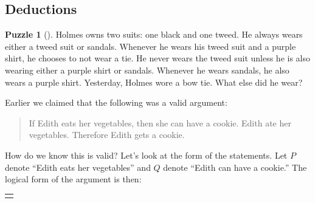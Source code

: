 \documentclass[10pt,]{book}
\theoremstyle{plain}
\theoremstyle{definition}
\theoremstyle{definition}
\theoremstyle{definition}
\newtheorem{investigation}[project]{Puzzle}
\numberwithin{equation}{chapter}
\newcommand{\hrulethin}  {\noalign{\hrule height 0.04em}}
\newlength{\panelmax}
\def\imp{\rightarrow}
\begin{document}
\subsection[{Deductions}]{Deductions}\label{subsection-56}
\begin{investigation}[]\label{investigation-12}
\hypertarget{p-2319}{}%
Holmes owns two suits: one black and one tweed. He always wears either a tweed suit or sandals. Whenever he wears his tweed suit and a purple shirt, he chooses to not wear a tie. He never wears the tweed suit unless he is also wearing either a purple shirt or sandals. Whenever he wears sandals, he also wears a purple shirt. Yesterday, Holmes wore a bow tie. What else did he wear?%
\end{investigation}
\hypertarget{p-2320}{}%
Earlier we claimed that the following was a valid argument:%
\begin{quote}\hypertarget{blockquote-11}{}
\hypertarget{p-2321}{}%
If Edith eats her vegetables, then she can have a cookie. Edith ate her vegetables. Therefore Edith gets a cookie.%
\end{quote}
\hypertarget{p-2322}{}%
How do we know this is valid? Let's look at the form of the statements. Let \(P\) denote ``Edith eats her vegetables'' and \(Q\) denote ``Edith can have a cookie.'' The logical form of the argument is then:%
{%
\setlength{\panelmax}{0pt}
\ifdefined\panelboxAtabular\else\newsavebox{\panelboxAtabular}\fi%
\savebox{\panelboxAtabular}{%
\raisebox{\depth}{\parbox{1\linewidth}{\centering\begin{tabular}{cc}
&\(P \imp Q\)\tabularnewline[0pt]
&\(P\)\tabularnewline\hrulethin
\(\therefore\)&\(Q\)
\end{tabular}
}}}
\ifdefined\phAtabular\else\newlength{\phAtabular}\fi%
\setlength{\phAtabular}{\ht\panelboxAtabular+\dp\panelboxAtabular}
\settototalheight{\phAtabular}{\usebox{\panelboxAtabular}}
\setlength{\panelmax}{\maxof{\panelmax}{\phAtabular}}
\leavevmode%
\setlength{\tabcolsep}{0\linewidth}
\par\medskip\noindent
\begin{tabular}{@{}*{1}{c}@{}}
\begin{minipage}[c][\panelmax][t]{1\linewidth}\usebox{\panelboxAtabular}\end{minipage}\end{tabular}\\
}%
\end{document}
